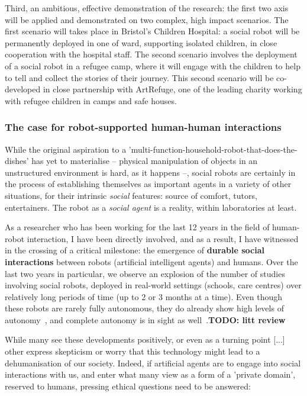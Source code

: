 \documentclass[11pt]{article}
\newcommand{\TODO}[1]{{\color{red}\textbf{TODO: #1}}}
\begin{document}
Third, an ambitious, effective demonstration of the research: the first two axis
will be applied and demonstrated on two complex, high impact scenarios. The
first scenario will takes place in Bristol's Children Hospital: a social robot
will be permanently deployed in one of ward, supporting isolated children, in
close cooperation with the hospital staff. The second scenario involves the
deployment of a social robot in a refugee camp, where it will engage with the
children to help to tell and collect the stories of their journey. This second
scenario will be co-developed in close partnership with ArtRefuge, one of the
leading charity working with refugee children in camps and safe houses.

\subsubsection{The case for robot-supported human-human interactions}

While the original aspiration to a
'multi-function-household-robot-that-does-the-dishes' has yet to materialise --
physical manipulation of objects in an unstructured environment is hard, as it
happens --, social robots are certainly in the process of establishing
themselves as important agents in a variety of other situations, for their
intrinsic \emph{social} features: source of comfort, tutors, entertainers. The
robot as a \emph{social agent} is a reality, within laboratories at least.

As a researcher who has been working for the last 12 years in the field of
human-robot interaction, I have been directly involved, and as a result, I have
witnessed in the crossing of a critical milestone: the emergence of
\textbf{durable social interactions} between robots (artificial intelligent
agents) and humans. Over the last two years in particular, we observe an
explosion of the number of studies involving social robots, deployed in
real-world settings (schools, care centres) over relatively long periods of time
(up to 2 or 3 months at a time). Even though these robots are rarely fully
autonomous, they do already show high levels of autonomy~\cite{emmanuel}, and complete autonomy
is in sight as well~\cite{strands}.\TODO{litt review}

While many see these developments positively, or even as a turning point [...]
other express skepticism or worry that this technology might lead to a
dehumanisation of our society. Indeed, if artificial agents are to engage into
social interactions with us, and enter what many view as a form of a 'private
domain', reserved to humans, pressing ethical questions need to be answered:
\end{document}
